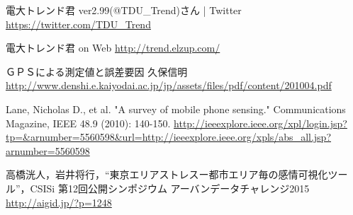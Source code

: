 \begin{thebibliography}{2}
        電大トレンド君 ver2.99(@TDU\_Trend)さん | Twitter
        \url{https://twitter.com/TDU_Trend}

        電大トレンド君 on Web
        \url{http://trend.elzup.com/}


    ＧＰＳによる測定値と誤差要因 久保信明
        \url{http://www.denshi.e.kaiyodai.ac.jp/jp/assets/files/pdf/content/201004.pdf}

        Lane, Nicholas D., et al. "A survey of mobile phone sensing." Communications Magazine, IEEE 48.9 (2010): 140-150.
        \url{http://ieeexplore.ieee.org/xpl/login.jsp?tp=&arnumber=5560598&url=http://ieeexplore.ieee.org/xpls/abs_all.jsp?arnumber=5560598}

        高橋洸人，岩井将行，“東京エリアストレスー都市エリア毎の感情可視化ツール”，CSISi 第12回公開シンポジウム アーバンデータチャレンジ2015
        \url{http://aigid.jp/?p=1248}

\end{thebibliography}
